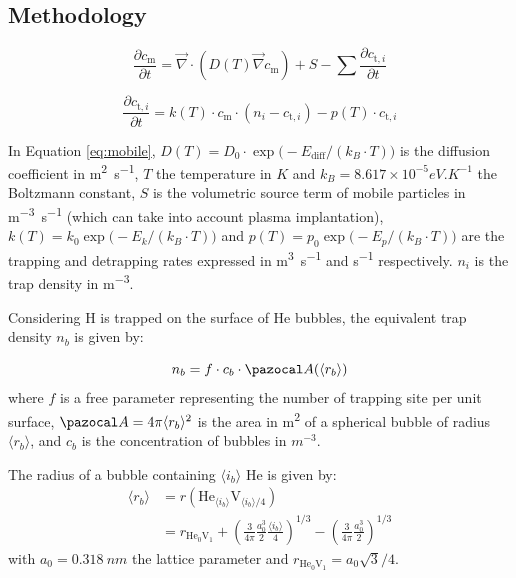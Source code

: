 \subsection{Methodology}

\begin{equation}
    \frac{\partial c_\mathrm{m}}{\partial t}=\vec{\nabla} \cdot\left(D(T) \vec{\nabla}c_\mathrm{m}\right)+S-\sum \frac{\partial c_{\mathrm{t}, i}}{\partial t}
    \label{eq:mobile}
\end{equation}

\begin{equation}
    \frac{\partial c_{\mathrm{t}, i}}{\partial t}=k(T) \cdot c_\mathrm{m} \cdot\left(n_{i}-c_{\mathrm{t}, i}\right)-p(T) \cdot c_{\mathrm{t}, i}
    \label{eq:trapped}
\end{equation}

In Equation \ref{eq:mobile}, ${D(T)=D_0 \cdot \exp\big(-E_\mathrm{diff}/ (k_B \cdot T )\big)}$ is the diffusion coefficient in \si{m^2.s^{-1}}, $T$ the temperature in $\si{K}$ and ${k_B = 8.617 \times 10^{-5} \si{eV.K^{-1}}}$ the Boltzmann constant, $S$ is the volumetric source term of mobile particles in \si{m^{-3}.s^{-1}} (which can take into account plasma implantation), $k(T)=k_0\exp{\big(-E_{k} / (k_B \cdot T ) \big)}$ and $p(T)=p_0\exp{\big(-E_{p}/ (k_B \cdot T )\big)}$ are the trapping and detrapping rates expressed in \si{m^3.s^{-1}} and \si{s^{-1}} respectively.
$n_i$ is the trap density in \si{m^{-3}}.

Considering H is trapped on the surface of He bubbles, the equivalent trap density $n_b$ is given by:

\begin{equation}
    n_b = f \cdot c_b \cdot \Ab(\langle r_b \rangle)
\end{equation}
where $f$ is a free parameter representing the number of trapping site per unit surface, $\Ab = 4\pi \langle r_b \rangle^2$ is the area in \si{m^2} of a spherical bubble of radius $\langle r_b \rangle$, and $c_b$ is the concentration of bubbles in $\si{m^{-3}}$.


The radius of a bubble containing $\langle i_b \rangle$ He is given by:
\begin{equation}
    \begin{split}
        \langle r_b \rangle &= r(\mathrm{He}_{\langle i_b \rangle}\mathrm{V}_{\langle i_b \rangle/4}) \\
        &= r_{\mathrm{He}_0 \mathrm{V}_1} + \left(\frac{3}{4 \pi} \frac{a_0^3}{2} \frac{\langle i_b \rangle}{4} \right)^{1/3} - \left(\frac{3}{4 \pi} \frac{a_0^3}{2} \right)^{1/3}
    \end{split}
    \label{eq: radius average}
\end{equation}
with $a_0 = \SI{0.318}{nm}$ the lattice parameter and $r_{\mathrm{He}_0 \mathrm{V}_1} =  a_0 \sqrt{3}/4$.


